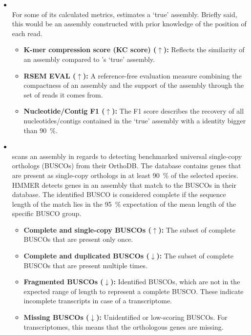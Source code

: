 \documentclass[12pt,a4paper,english]{article}
\begin{document}
\begin{itemize}
			\item \textbf{\detonate} \citep{DETONATE:14}\\
				For some of its calculated metrics, \detonate estimates a `true' assembly. Briefly said, this would be an assembly constructed with prior knowledge of the position of each read.
				\begin{itemize}
					\item \textbf{K-mer compression score (KC score) ($\uparrow$):} 
					Reflects the similarity of an assembly compared to \detonate{}'s `true' assembly.					
					\item \textbf{RSEM EVAL ($\uparrow$):} A reference-free evaluation measure combining the compactness of an assembly and the support of the assembly through the set of reads it comes from.
					\item \textbf{Nucleotide/Contig F1 ($\uparrow$):} The F1 score describes the recovery of all nucleotides/contigs contained in the `true' assembly with a identity bigger than 90~\%.
				\end{itemize}

			\item \textbf{\busco} \citep{busco:15, busco:18}\\
			\busco scans an assembly in regards to detecting benchmarked universal single-copy orthologs (BUSCOs) from their OrthoDB. The database contains genes that are present as single-copy orthologs in at least 90~\% of the selected species.
			HMMER \citep{hmmer:11} detects genes in an assembly that match to the BUSCOs in their database. The identified BUSCO is considered complete if the sequence length of the match lies in the 95~\% expectation of the mean length of the specific BUSCO group.
				\begin{itemize}
					\item \textbf{Complete and single-copy BUSCOs ($\uparrow$):}
						The subset of complete BUSCOs that are present only once.
					\item \textbf{Complete and duplicated BUSCOs ($\downarrow$):}
						The subset of complete BUSCOs that are present multiple times.
					\item \textbf{Fragmented BUSCOs ($\downarrow$):}
						Identified BUSCOs, which are not in the expected range of length to represent a complete BUSCO. These indicate incomplete transcripts in case of a transcriptome.
					\item \textbf{Missing BUSCOs ($\downarrow$):}
						Unidentified or low-scoring BUSCOs.	For transcriptomes, this means that the orthologous genes are missing.
				\end{itemize}


\end{itemize}
\end{document}
